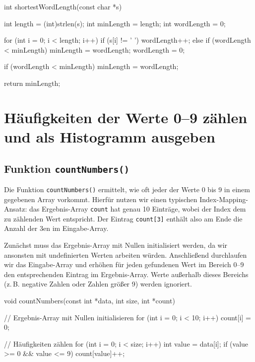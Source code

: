 \begin{codebox}[lang=c, fontsize=\small]
int shortestWordLength(const char *s) {
    int length = (int)strlen(s);
    int minLength = length;
    int wordLength = 0;

    for (int i = 0; i < length; i++) {
        if (s[i] != ' ') {
            wordLength++;
        } else {
            if (wordLength < minLength) {
                minLength = wordLength;
            }
            wordLength = 0;
        }
    }

    if (wordLength < minLength) {
        minLength = wordLength;
    }

    return minLength;
}
\end{codebox}




\chapter{Häufigkeiten der Werte 0–9 zählen und als Histogramm ausgeben}

\section*{Funktion \texttt{countNumbers()}}

Die Funktion \texttt{countNumbers()} ermittelt, wie oft jeder der Werte
0 bis 9 in einem gegebenen Array vorkommt. Hierfür nutzen wir einen typischen
Index-Mapping-Ansatz: das Ergebnis-Array \texttt{count} hat genau 10
Einträge, wobei der Index dem zu zählenden Wert entspricht. Der Eintrag
\texttt{count[3]} enthält also am Ende die Anzahl der 3en im
Eingabe-Array.

Zunächst muss das Ergebnis-Array mit Nullen initialisiert werden, da wir
ansonsten mit undefinierten Werten arbeiten würden. Anschließend durchlaufen
wir das Eingabe-Array und erhöhen für jeden gefundenen Wert im Bereich 0--9
den entsprechenden Eintrag im Ergebnis-Array. Werte außerhalb dieses Bereichs
(z.\,B. negative Zahlen oder Zahlen größer 9) werden ignoriert.

\begin{codebox}[lang=c, fontsize=\small]
void countNumbers(const int *data, int size, int *count) {
    // Ergebnis-Array mit Nullen initialisieren
    for (int i = 0; i < 10; i++) {
        count[i] = 0;
    }

    // Häufigkeiten zählen
    for (int i = 0; i < size; i++) {
        int value = data[i];
        if (value >= 0 && value <= 9) {
            count[value]++;
        }
    }
}
\end{codebox}

